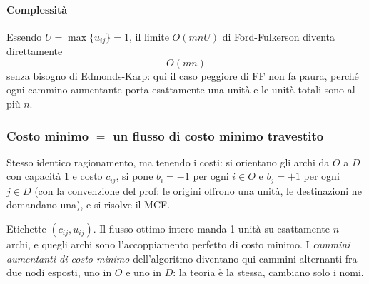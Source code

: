 \documentclass[12pt]{extarticle} %
\begin{document}
\paragraph{Complessità}
Essendo $U = \max\{u_{ij}\} = 1$, il limite $O(mnU)$ di Ford-Fulkerson diventa direttamente
\[
O(mn)
\]
senza bisogno di Edmonds-Karp: qui il caso peggiore di FF non fa paura, perché ogni cammino aumentante porta esattamente una unità e le unità totali sono al più $n$.

\subsubsection{Costo minimo $=$ un flusso di costo minimo travestito}
Stesso identico ragionamento, ma tenendo i costi: si orientano gli archi da $O$ a $D$ con capacità 1 e costo $c_{ij}$, si pone $b_i = -1$ per ogni $i \in O$ e $b_j = +1$ per ogni $j \in D$ (con la convenzione del prof: le origini offrono una unità, le destinazioni ne domandano una), e si risolve il MCF.
\begin{center}
\end{center}
\noindent Etichette $(c_{ij},u_{ij})$. Il flusso ottimo intero manda 1 unità su esattamente $n$ archi, e quegli archi sono l'accoppiamento perfetto di costo minimo. I \emph{cammini aumentanti di costo minimo} dell'algoritmo diventano qui cammini alternanti fra due nodi esposti, uno in $O$ e uno in $D$: la teoria è la stessa, cambiano solo i nomi.
\end{document}

